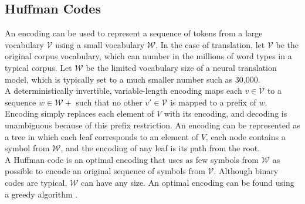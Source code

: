 \subsection{Huffman Codes}

An encoding can be used to represent a sequence of tokens from a large
vocabulary $\mathcal{V}$ using a small vocabulary $\mathcal{W}$. In the case of
translation, let $\mathcal{V}$ be the original corpus vocabulary, which can
number in the millions of word types in a typical corpus. Let $\mathcal{W}$ be
the limited vocabulary size of a neural translation model, which is typically
set to a much smaller number such as 30,000.\\

A deterministically invertible, variable-length encoding maps each
$v\in\mathcal{V}$ to a sequence $w \in \mathcal{W}+$ such that no other
$v'\in\mathcal{V}$ is mapped to a prefix of $w$. Encoding simply replaces each
element of $V$ with its encoding, and decoding is unambiguous because of this
prefix restriction. An encoding can be represented as a tree in which each leaf
corresponds to an element of $V$, each node contains a symbol from
$\mathcal{W}$, and the encoding of any leaf is its path from the root.\\

A Huffman code is an optimal encoding that uses as few symbols from
$\mathcal{W}$ as possible to encode an original sequence of symbols from
$\mathcal{V}$. Although binary codes are typical, $\mathcal{W}$ can have any
size. An optimal encoding can be found using a greedy algorithm
\cite{huffman}.\\
